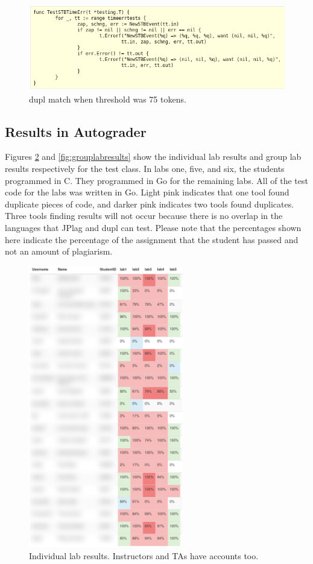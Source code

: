 \documentclass[10pt,journal,compsoc]{IEEEtran}
\begin{document}
		\begin{figure}[h!]
			\includegraphics[width=1.0\textwidth]{dupl75.png}
			\caption{dupl match when threshold was 75 tokens.}
			\label{fig:dupl75}
		\end{figure}
		
		\subsection{Results in Autograder}
		
		Figures \ref{fig:indlabresults} and \ref{fig:grouplabresults} show the individual lab results and group lab results respectively for the test class. In labs one, five, and six, the students programmed in C. They programmed in Go for the remaining labs. All of the test code for the labs was written in Go.  Light pink indicates that one tool found duplicate pieces of code, and darker pink indicates two tools found duplicates. Three tools finding results will not occur because there is no overlap in the languages that JPlag and dupl can test. Please note that the percentages shown here indicate the percentage of the assignment that the student has passed and not an amount of plagiarism.
		
		\begin{figure}[h!]
			\includegraphics[width=0.6\textwidth]{indlabresults.png}
			\caption{Individual lab results. Instructors and TAs have accounts too.}
			\label{fig:indlabresults}
		\end{figure}
		
\end{document}
